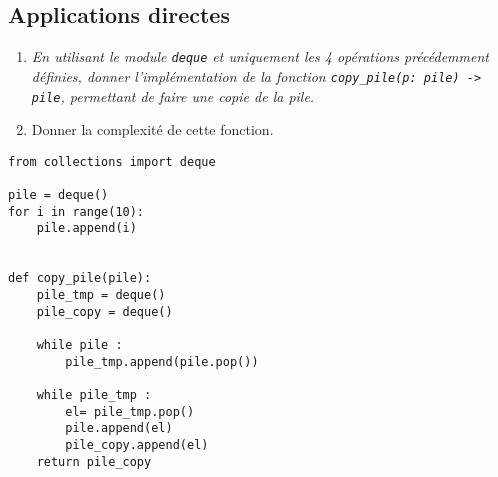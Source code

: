 \subsection{Applications directes}

\begin{exemple}
\begin{enumerate}
\item \textit{En utilisant le module \texttt{deque} et uniquement les 4 opérations précédemment définies, donner l'implémentation de la fonction \texttt{copy\_pile(p: pile) -> pile}, permettant de faire une copie de la pile.}
\item {Donner la complexité de cette fonction.}
\end{enumerate}

\ifprof
\begin{lstlisting}
from collections import deque

pile = deque()
for i in range(10):
    pile.append(i)


def copy_pile(pile):
    pile_tmp = deque()
    pile_copy = deque()
    
    while pile : 
        pile_tmp.append(pile.pop())
        
    while pile_tmp : 
        el= pile_tmp.pop()
        pile.append(el)
        pile_copy.append(el)
    return pile_copy
\end{lstlisting}
\else
\vspace{5cm}
\fi

\end{exemple}





